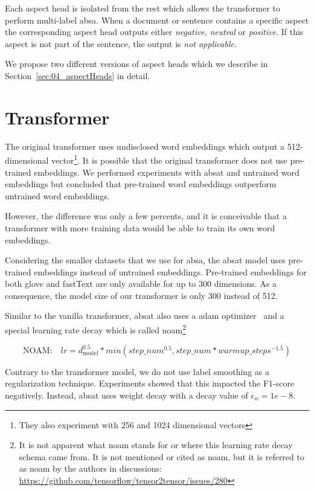Each aspect head is isolated from the rest which allows the transformer to perform multi-label \gls{absa}. When a document or sentence contains a specific aspect the corresponding aspect head outputs either \textit{negative}, \textit{neutral} or \textit{positive}. If this aspect is not part of the sentence, the output is \textit{not applicable}.

We propose two different versions of aspect heads which we describe in Section~\ref{sec:04_aspectHeads} in detail.

\section{Transformer}
\label{sec:04_transformer}

The original transformer uses undisclosed word embeddings which output a 512-dimensional vector\footnote{They also experiment with 256 and 1024 dimensional vectors}. It is possible that the original transformer does not use pre-trained embeddings. We performed experiments with \gls{absat} and untrained word embeddings but concluded that pre-trained word embeddings outperform untrained word embeddings. 

However, the difference was only a few percents, and it is conceivable that a transformer with more training data would be able to train its own word embeddings.
\medskip

Considering the smaller datasets that we use for \gls{absa}, the \gls{absat} model uses pre-trained embeddings instead of untrained embeddings. Pre-trained embeddings for both \gls{glove} and fastText are only available for up to 300 dimensions. As a consequence, the model size of our transformer is only 300 instead of 512.
\bigskip

Similar to the vanilla transformer, \gls{absat} also uses a \gls{adam} optimizer~\cite{Kingma2014} and a special learning rate decay which is called noam\footnote{It is not apparent what noam stands for or where this learning rate decay schema came from. It is not mentioned or cited as noam, but it is referred to as noam by the authors in discussions: \url{https://github.com/tensorflow/tensor2tensor/issues/280}}~\cite{Vaswani2017}

\begin{equation}
    \text{NOAM:} \quad lr = d_\text{model}^{0.5} * min(step\_num^{0.5}, step\_num*warmup\_steps^{-1.5})
\end{equation}
 
Contrary to the transformer model, we do not use label smoothing as a regularization technique. Experiments showed that this impacted the F1-score negatively. Instead, \gls{absat} uses weight decay with a decay value of $\epsilon_w = 1e-8$.


